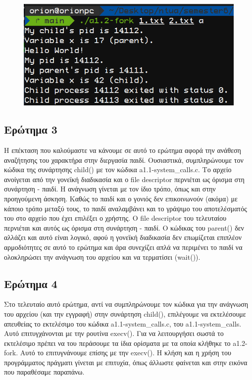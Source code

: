 \documentclass{article}
\begin{document}
	\begin{figure}[H]
		\centering
		\includegraphics[scale = 0.45]{a1.2.png}
	\end{figure}
	
	\subsection{Ερώτημα 3}
	
	Η επέκταση που καλούμαστε να κάνουμε σε αυτό το ερώτημα αφορά την ανάθεση αναζήτησης του χαρακτήρα στην διεργασία παιδί. Ουσιαστικά, συμπληρώνουμε τον κώδικα της συνάρτησης child() με τον κώδικα a1.1-system\_calls.c. Το αρχείο ανοίγεται από την γονεϊκή διαδικασία και ο file descriptor περνιέται ως όρισμα στη συνάρτηση - παιδί. Η ανάγνωση γίνεται με τον ίδιο τρόπο, όπως και στην προηγούμενη άσκηση. Καθώς το παιδί και ο γονιός δεν επικοινωνούν (ακόμα) με κάποιο τρόπο μεταξύ τους, το παιδί αναλαμβάνει και το γράψιμο του αποτελέσματός του στο αρχείο που έχει επιλέξει ο χρήστης. Ο file descriptor του τελευταίου περνιέται και αυτός ως όρισμα στη συνάρτηση - παιδί. Ο κώδικας του parent() δεν αλλάζει και αυτό είναι λογικό, αφού η γονεϊκή διαδικασία δεν επωμίζεται επιπλέον αρμοδιότητες σε αυτό το ερώτημα και άρα συνεχίζει απλά να περιμένει το παιδί να ολοκληρώσει την ανάγνωση του αρχείου και να τερματίσει (wait()). 
	
	\subsection{Ερώτημα 4}
	
	Στο τελευταίο αυτό ερώτημα, αντί να συμπληρώνουμε τον κώδικα για την ανάγνωση του αρχείου (και την εγγραφή) στην συνάρτηση child(), επιλέγουμε να εκτελέσουμε απευθείας το εκτελέσιμο του κώδικα a1.1-system\_calls.c, του a1.1-system\_calls. Αυτό επιτυγχάνονται με την ρουτίνα execv(). Για να λειτουργήσει σωστά το εκτελέσιμο πρέπει να του περάσουμε τα ίδια ορίσματα με τα οποία κλήθηκε το a1.2-fork. Αυτό το επιτυγνάνουμε επίσης με την execv(). Η κλήση και η χρήση του προγράμματος πράγματι γίνεται με επιτυχία, όπως άλλωστε φαίνεται και στην εικόνα που παραθέσαμε παραπάνω.
	
\end{document}

